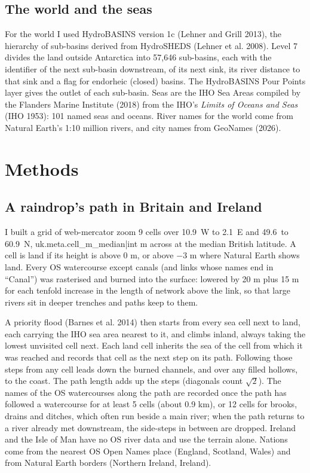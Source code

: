 \documentclass[11pt,a4paper]{article}
\begin{document}
\subsection{The world and the seas}

For the world I used HydroBASINS version 1c (Lehner and Grill 2013), the hierarchy of sub-basins derived from HydroSHEDS (Lehner et al. 2008). Level 7 divides the land outside Antarctica into 57,646 sub-basins, each with the identifier of the next sub-basin downstream, of its next sink, its river distance to that sink and a flag for endorheic (closed) basins. The HydroBASINS Pour Points layer gives the outlet of each sub-basin. Seas are the IHO Sea Areas compiled by the Flanders Marine Institute (2018) from the IHO's \emph{Limits of Oceans and Seas} (IHO 1953): 101 named seas and oceans. River names for the world come from Natural Earth's 1:10 million rivers, and city names from GeoNames (2026).

\section{Methods}

\subsection{A raindrop's path in Britain and Ireland}

I built a grid of web-mercator zoom 9 cells over 10.9\textdegree\ W to 2.1\textdegree\ E and 49.6\textdegree\ to 60.9\textdegree\ N, {{uk.meta.cell_m_median|int}} m across at the median British latitude. A cell is land if its height is above 0 m, or above $-3$ m where Natural Earth shows land. Every OS watercourse except canals (and links whose names end in ``Canal'') was rasterised and burned into the surface: lowered by 20 m plus 15 m for each tenfold increase in the length of network above the link, so that large rivers sit in deeper trenches and paths keep to them.

A priority flood (Barnes et al. 2014) then starts from every sea cell next to land, each carrying the IHO sea area nearest to it, and climbs inland, always taking the lowest unvisited cell next. Each land cell inherits the sea of the cell from which it was reached and records that cell as the next step on its path. Following those steps from any cell leads down the burned channels, and over any filled hollows, to the coast. The path length adds up the steps (diagonals count $\sqrt{2}$). The names of the OS watercourses along the path are recorded once the path has followed a watercourse for at least 5 cells (about 0.9 km), or 12 cells for brooks, drains and ditches, which often run beside a main river; when the path returns to a river already met downstream, the side-steps in between are dropped. Ireland and the Isle of Man have no OS river data and use the terrain alone. Nations come from the nearest OS Open Names place (England, Scotland, Wales) and from Natural Earth borders (Northern Ireland, Ireland).
\end{document}
